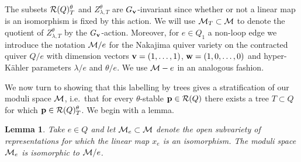 \documentclass{amsart}
\newtheorem{lem}[thm]{Lemma}
\theoremstyle{definition}
\begin{document}

The subsets $\mathcal{R}(Q)_T^\theta$ and $Z_{\lambda,T}^\theta$ are $G_{\mathbf{v}}$-invariant since whether or not a linear map is an isomorphism is fixed by this action.
We will use $\mathcal{M}_T \subset \mathcal{M}$ to denote the quotient of $Z_{\lambda,T}^\theta$ by the $G_{\mathbf{v}}$-action.
Moreover, for $e\in Q_1$ a non-loop edge we introduce the notation $\mathcal{M}/e$ for the Nakajima quiver variety on the contracted quiver $Q/e$ with dimension vectors $\mathbf{v}= (1,\ldots,1)$, $\mathbf{w}= (1,0,\ldots,0)$ and hyper-K\"ahler parameters $\lambda/e$ and $\theta/e$.
We use $\mathcal{M}-e$ in an analogous fashion.

We now turn to showing that this labelling by trees gives a stratification of our moduli space $\mathcal{M}$, i.e.\ that for every $\theta$-stable $\mathbf{p} \in \mathcal{R}(Q)$ there exists a tree $T \subset Q$ for which $\mathbf{p} \in \mathcal{R}(Q)_T^\theta$.
We begin with a lemma.

\begin{lem}
Take $e \in Q$ and let $\mathcal{M}_{e} \subset \mathcal{M}$ denote the open subvariety of representations for which the linear map $x_e$ is an isomorphism.
The moduli space $\mathcal{M}_{e}$ is isomorphic to $\mathcal{M}/e$.
\end{lem}
\end{document}

